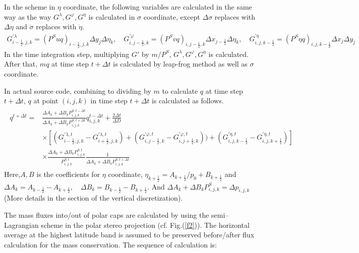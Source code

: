 In the scheme in \(\eta\) coordinate, the following variables are calculated in the same way as the way \(G^{\lambda}, G^{\varphi}, G^{\eta}\) is calculated in \(\sigma\) coordinate, except
\(\Delta \sigma\) replaces with \(\Delta \eta\) and \(\dot{\sigma}\) replaces with \(\dot{\eta}\).
\begin{eqnarray}G^{\prime \lambda}_{i-\frac{1}{2},j,k}=(P^{S}uq)_{i-\frac{1}{2},j,k} \Delta y_{j} \Delta \eta_{k},\quad G^{\prime \varphi}_{i,j-\frac{1}{2},k}=(P^{S}vq)_{i,j-\frac{1}{2},k} \Delta x_{j-\frac{1}{2}} \Delta \eta_{k},\quad G^{\prime \eta}_{i,j,k-\frac{1}{2}}=(P^{S} \dot{\eta} q)_{i,j,k-\frac{1}{2}} \Delta x_{j} \Delta y_{j}\end{eqnarray}
In the time integration step, multiplying \(G\prime\) by \(m/P^{S}\), \(G^{\lambda}, G^{\varphi}, G^{\eta}\) is calculated. After that, \(mq\) at time step \(t+\Delta t\) is calculated by leap-frog
method as well as \(\sigma\) coordinate.

In actual source code, combining to dividing by \(m\) to calculate \(q\) at time step \(t+\Delta t\), \(q\) at point \((i,j,k)\) in time step \(t+\Delta t\) is calculated as follows. \begin{eqnarray}\begin{split}
q^{t+\Delta t}=&\frac{\Delta A_{k}+\Delta B_{k} P^{S,t-\Delta t}_{i,j,k}}{\Delta A_{k}+\Delta B_{k} P^{S,t+\Delta t}_{i,j,k}}q^{t-\Delta t}_{i,j,k}+\frac{2\Delta t}{\Delta D}\\
&\times [(G^{\prime \lambda,t}_{i-\frac{1}{2},j,k}-G^{\prime \lambda,t}_{i+\frac{1}{2},j,k})+(G^{\prime \varphi,t}_{i,j-\frac{1}{2},k}-G^{\prime \varphi,t}_{i,j+\frac{1}{2},k}))+(G^{\prime \eta,t}_{i,j,k-\frac{1}{2}}-G^{\prime \eta,t}_{i,j,k+\frac{1}{2}})]\\
&\times \frac{\Delta A_{k}+\Delta B_{k} P^{S,t}_{i,j,k}}{P^{S,t}_{i,j,k}}\frac{1}{\Delta A_{k}+\Delta B_{k} P^{S,t+\Delta t}_{i,j,k}}
\end{split}
\end{eqnarray} Here,\(A,B\) is the coefficients for \(\eta\) coordinate, \(\eta_{k+\frac{1}{2}}=A_{k+\frac{1}{2}}/p_{0}+B_{k+\frac{1}{2}}\) and
\(\Delta A_{k}=A_{k-\frac{1}{2}}-A_{k+\frac{1}{2}},\quad \Delta B_{k}=B_{k-\frac{1}{2}}-B_{k+\frac{1}{2}}\). And \(\Delta A_{k}+\Delta B_{k} P^{S}_{i,j,k}=\Delta p_{i,j,k}\)(More details in the
section of the vertical discretization).

The mass fluxes into/out of polar caps are calculated by using the semi--Lagrangian scheme in the polar stereo projection (cf. Fig.(\ref{f2})). The horizontal average at the highest latitude band
is assumed to be preserved before/after flux calculation for the mass conservation. The sequence of calculation is:

